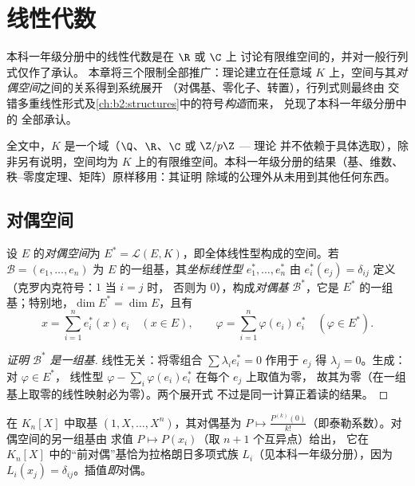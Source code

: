 \chapter{线性代数}\label{ch:b2:linalg}

本科一年级分册中的线性代数是在 $\R$ 或 $\C$ 上
讨论有限维空间的，并对一般行列式仅作了承认。
本章将三个限制全部推广：理论建立在任意域
$K$ 上，空间与其\emph{对偶空间}之间的关系得到系统展开
（对偶基、零化子、转置），行列式则最终由
交错多重线性形式及\cref{ch:b2:structures}中的符号\emph{构造}而来，
兑现了本科一年级分册中的
全部承认。

全文中，$K$ 是一个域（$\Q$、$\R$、$\C$ 或 $\Z/p\Z$ --- 理论
并不依赖于具体选取），除非另有说明，空间均为
$K$ 上的有限维空间。本科一年级分册的结果（基、维数、
秩--零度定理、矩阵）原样移用：其证明
除域的公理外从未用到其他任何东西。

\section{对偶空间}

\begin{definition}\label{def:b2:linalg:dual}
设 $E$ 的\emph{对偶空间}为 $E^* = \mathcal{L}(E,
K)$，即全体线性型构成的空间。若 $\mathcal{B} = (e_1, \dots, e_n)$
为 $E$ 的一组基，其\emph{坐标线性型} $e_1^*, \dots, e_n^*$
由 $e_i^*(e_j) = \delta_{ij}$ 定义（克罗内克符号：$1$ 当 $i = j$ 时，
否则为 $0$），构成\emph{对偶基}
$\mathcal{B}^*$，它是 $E^*$ 的一组基；特别地，$\dim E^* = \dim E$，且有
\[
x = \sum_{i=1}^{n} e_i^*(x)\, e_i \quad (x \in E),
\qquad
\varphi = \sum_{i=1}^{n} \varphi(e_i)\, e_i^* \quad (\varphi \in
E^*).
\]
\end{definition}

\begin{proof}[证明 $\mathcal{B}^*$ 是一组基]
线性无关：将零组合 $\sum \lambda_i e_i^* = 0$ 作用于
$e_j$ 得 $\lambda_j = 0$。生成：对 $\varphi \in E^*$，
线性型 $\varphi - \sum_i \varphi(e_i) e_i^*$ 在每个 $e_j$ 上取值为零，
故其为零（在一组基上取零的线性映射必为零）。两个展开式
不过是同一计算正着读的结果。
\end{proof}

\begin{example}\label{ex:b2:linalg:dualexamples}
在 $K_n[X]$ 中取基 $(1, X, \dots, X^n)$，其对偶基为 $P
\mapsto \frac{P^{(k)}(0)}{k!}$（即泰勒系数）。对偶空间的另一组基由
求值 $P \mapsto P(x_i)$（取 $n + 1$ 个互异点）给出，
它在 $K_n[X]$ 中的“前对偶”基恰为拉格朗日多项式族
$L_i$（见本科一年级分册），因为 $L_i(x_j) =
\delta_{ij}$。插值\emph{即}对偶。
\end{example}

